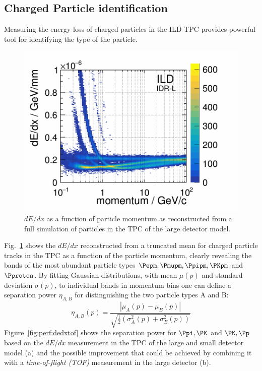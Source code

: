 \subsection{Charged Particle identification}
%
%
Measuring the energy loss of charged particles in the ILD-TPC provides powerful tool for identifying the type of the particle.
\begin{figure}[b!]
\includegraphics[width=0.8\hsize]{Performance/fig/dEdx_BBAll_lowGran_bigCap.png}
\caption{\label{fig:perf:dedx_tpc}
  $dE/dx$ as a function of particle momentum as reconstructed from a full simulation of particles in the TPC of the large detector model.
}
\end{figure}
%
Fig.~\ref{fig:perf:dedx_tpc} shows the $dE/dx$ reconstructed from a truncated mean for charged particle tracks in the TPC as a function of
the particle momentum, clearly revealing the bands of the most abundant particle types $\Pepm, \Pmupm, \Ppipm, \PKpm$ and $\Pproton$.
By fitting Gaussian distributions, with mean $\mu(p)$ and standard deviation $\sigma(p)$, to individual bands in momentum bins one can
define a separation power $\eta_{A,B}$ for distinguishing the two particle types A and B:
\begin{equation}
\eta_{A,B}(p) = \frac{ |\mu_A(p) - \mu_B(p)| } { \sqrt{ \frac{1}{2} ( \sigma^2_A(p) + \sigma^2_B(p) )  }  }
\label{ild:eq:seppow}
\end{equation}
Figure~\ref{fig:perf:dedxtof} shows the separation power
for $\Ppi,\PK$ and $\PK,\Pp$  based on the $dE/dx$ measurement in the TPC of the large and small detector model (a)
and the possible improvement that could be achieved by combining it with a  {\em time-of-flight (TOF)} measurement in the large detector (b).
